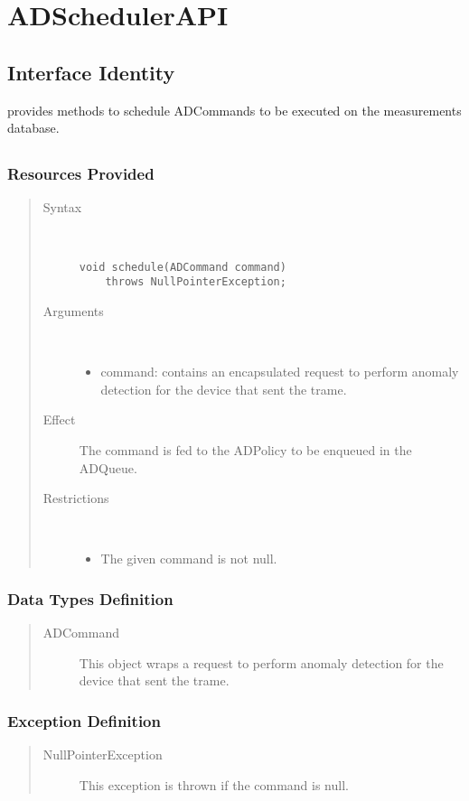 \section{ADSchedulerAPI}

\subsection{Interface Identity}

\npar {} provides methods to schedule
ADCommands to be executed on the measurements database.

\subsection{}

\subsubsection{Resources Provided}

\begin{quote}
	\begin{description}
		\item[Syntax] \ 
		\begin{verbatim}
void schedule(ADCommand command)
    throws NullPointerException;
		\end{verbatim}
		\item[Arguments] \
		\begin{itemize}
			\item command: contains an encapsulated request to perform anomaly detection
			for the device that sent the trame.
		\end{itemize}
		\item[Effect] The command is fed to the ADPolicy to be enqueued in the
		ADQueue.
		\item[Restrictions] \ 
		\begin{itemize}
			\item The given command is not null.
		\end{itemize}
	\end{description} 
\end{quote}

\subsubsection{Data Types Definition}

\begin{quote}
	\begin{description}
		\item[ADCommand] This object wraps a request to perform anomaly detection for
		the device that sent the trame.	
	\end{description} 
\end{quote}

\subsubsection{Exception Definition}

\begin{quote}
	\begin{description}
		\item[NullPointerException] This exception is thrown if the command is null.
	\end{description} 
\end{quote}